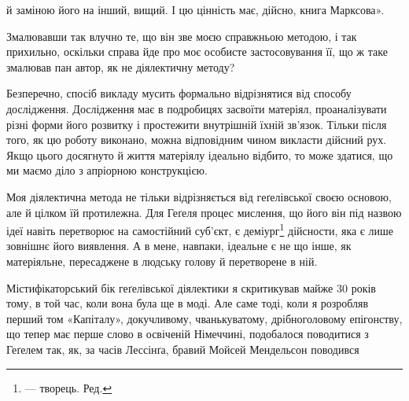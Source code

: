 \parcont{}  %
й заміною його на інший, вищий. І цю цінність має, дійсно,
книга Марксова».

Змалювавши так влучно те, що він зве моєю справжньою методою,
і так прихильно, оскільки справа йде про моє особисте
застосовування її, що ж таке змалював пан автор, як не діялектичну
методу?

Безперечно, спосіб викладу мусить формально відрізнятися
від способу дослідження. Дослідження має в подробицях засвоїти
матеріял, проаналізувати різні форми його розвитку і простежити
внутрішній їхній зв’язок. Тільки після того, як цю роботу виконано,
можна відповідним чином викласти дійсний рух. Якщо
цього досягнуто й життя матеріялу ідеально відбито, то може здатися,
що ми маємо діло з апріорною конструкцією.

Моя діялектична метода не тільки відрізняється від геґелівської
своєю основою, але й цілком їй протилежна. Для Геґеля процес
мислення, що його він під назвою ідеї навіть перетворює на самостійний
суб’єкт, є деміург\footnote*{
— творець. Ред.
} дійсности, яка є лише зовнішнє його
виявлення. А в мене, навпаки, ідеальне є не що інше, як матеріяльне,
пересаджене в людську голову й перетворене в ній.

Містифікаторський бік геґелівської діялектики я скритикував майже
30 років тому, в той час, коли вона була ще в моді. Але саме
тоді, коли я розробляв перший том «Капіталу», докучливому,
чванькуватому, дрібноголовому епігонству, що тепер має перше
слово в освіченій Німеччині, подобалося поводитися з Геґелем
так, як, за часів Лессінґа, бравий Мойсей Мендельсон поводився
\parbreak{}  %
